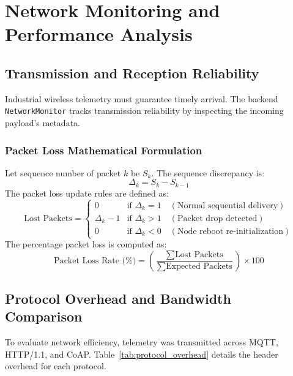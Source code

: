 \documentclass[12pt,a4paper]{report}
\begin{document}
\chapter{Network Monitoring and Performance Analysis}

\section{Transmission and Reception Reliability}
Industrial wireless telemetry must guarantee timely arrival. The backend \texttt{NetworkMonitor} tracks transmission reliability by inspecting the incoming payload's metadata. 

\subsection{Packet Loss Mathematical Formulation}
Let sequence number of packet $k$ be $S_k$. The sequence discrepancy is:
\begin{equation}
    \Delta_k = S_k - S_{k-1}
\end{equation}
The packet loss update rules are defined as:
\begin{equation}
    \text{Lost Packets} = 
    \begin{cases} 
      0 & \text{if } \Delta_k = 1 \quad (\text{Normal sequential delivery}) \\
      \Delta_k - 1 & \text{if } \Delta_k > 1 \quad (\text{Packet drop detected}) \\
      0 & \text{if } \Delta_k < 0 \quad (\text{Node reboot re-initialization})
    \end{cases}
\end{equation}
The percentage packet loss is computed as:
\begin{equation}
    \text{Packet Loss Rate (\%)} = \left( \frac{\sum \text{Lost Packets}}{\sum \text{Expected Packets}} \right) \times 100
\end{equation}

\section{Protocol Overhead and Bandwidth Comparison}
To evaluate network efficiency, telemetry was transmitted across MQTT, HTTP/1.1, and CoAP. Table~\ref{tab:protocol_overhead} details the header overhead for each protocol.
\end{document}
